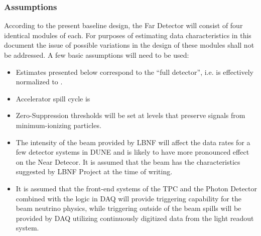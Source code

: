 \subsubsection{Assumptions}
\label{sec:detectors-sc-infrastructure-assumptions}
According to the present baseline design, the Far Detector will consist of four identical modules of \tpcmodulemass each.
For purposes of estimating data characteristics in this document the issue of possible variations in the design of these modules shall not be addressed. A few basic assumptions will need to be used:
\begin{itemize}
\item Estimates presented below correspond to the ``full detector'', i.e. is effectively
normalized to \dunedetectormass.
\item Accelerator spill cycle is \beamspillcycle
\item Zero-Suppression thresholds will be set at levels that preserve signals from minimum-ionizing particles.
\item The intensity of the beam provided by LBNF will affect the data rates for a few detector
systems in DUNE and is likely to have more pronounced effect on the Near Detecor.
It is assumed that the beam has the characteristics suggested by LBNF Project at the time of writing.
\item It is assumed that the front-end systems of the TPC and the Photon Detector combined
with the logic in DAQ will provide triggering capability for the beam neutrino physics, while
triggering outside of the beam spills will be provided by DAQ utilizing continuously digitized
data from the light readout system.
\end{itemize}


